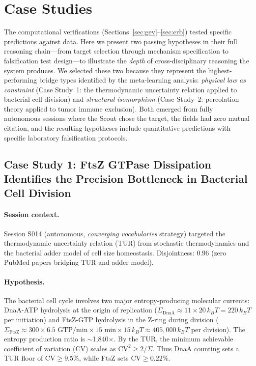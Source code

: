 \section{Case Studies}
\label{sec:case_studies}

The computational verifications (Sections~\ref{sec:gev}--\ref{sec:crb}) tested specific predictions against data. Here we present two passing hypotheses in their full reasoning chain---from target selection through mechanism specification to falsification test design---to illustrate the \emph{depth} of cross-disciplinary reasoning the system produces. We selected these two because they represent the highest-performing bridge types identified by the meta-learning analysis: \emph{physical law as constraint} (Case Study~1: the thermodynamic uncertainty relation applied to bacterial cell division) and \emph{structural isomorphism} (Case Study~2: percolation theory applied to tumor immune exclusion). Both emerged from fully autonomous sessions where the Scout chose the target, the fields had zero mutual citation, and the resulting hypotheses include quantitative predictions with specific laboratory falsification protocols.

\subsection{Case Study 1: FtsZ GTPase Dissipation Identifies the Precision Bottleneck in Bacterial Cell Division}
\label{sec:case_ftsz}

\paragraph{Session context.} Session S014 (autonomous, \emph{converging vocabularies} strategy) targeted the thermodynamic uncertainty relation (TUR) from stochastic thermodynamics and the bacterial adder model of cell size homeostasis. Disjointness: 0.96 (zero PubMed papers bridging TUR and adder model).

\paragraph{Hypothesis.} The bacterial cell cycle involves two major entropy-producing molecular currents: DnaA-ATP hydrolysis at the origin of replication ($\Sigma_\text{DnaA} \approx 11 \times 20\,k_B T = 220\,k_B T$ per initiation) and FtsZ-GTP hydrolysis in the Z-ring during division ($\Sigma_\text{FtsZ} \approx 300 \times 6.5\text{ GTP/min} \times 15\text{ min} \times 15\,k_B T \approx 405{,}000\,k_B T$ per division). The entropy production ratio is $\sim$1{,}840$\times$. By the TUR, the minimum achievable coefficient of variation (CV) scales as $\text{CV}^2 \geq 2/\Sigma$. Thus DnaA counting sets a TUR floor of $\text{CV} \geq 9.5\%$, while FtsZ sets $\text{CV} \geq 0.22\%$.

